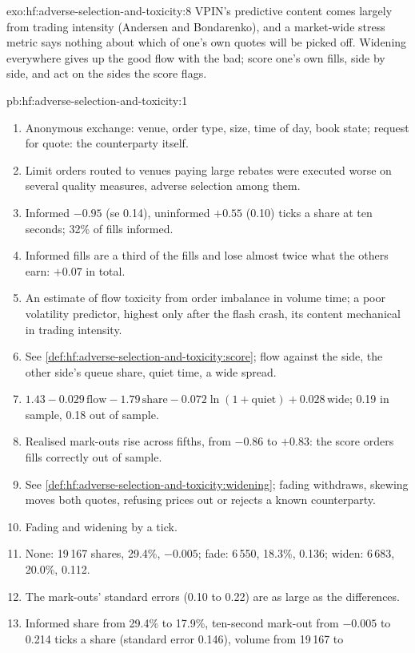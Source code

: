 \begin{solution}{exo:hf:adverse-selection-and-toxicity:8}
VPIN's predictive content comes largely from trading intensity (Andersen and Bondarenko), and a market-wide stress metric says nothing about which
of one's own quotes will be picked off. Widening everywhere gives up the good flow with the bad; score one's own fills, side by side, and act on the
sides the score flags.
\end{solution}

\begin{solution}{pb:hf:adverse-selection-and-toxicity:1}
\begin{enumerate}
\item Anonymous exchange: venue, order type, size, time of day, book state; request for quote: the counterparty itself.
\item Limit orders routed to venues paying large rebates were executed worse on several quality measures, adverse selection among them.
\item Informed $-0.95$ (se 0.14), uninformed $+0.55$ (0.10) ticks a share at ten seconds; 32\% of fills informed.
\item Informed fills are a third of the fills and lose almost twice what the others earn: $+0.07$ in total.
\item An estimate of flow toxicity from order imbalance in volume time; a poor volatility predictor, highest only after the flash crash, its content
mechanical in trading intensity.
\item See \cref{def:hf:adverse-selection-and-toxicity:score}; flow against the side, the other side's queue share, quiet time, a wide spread.
\item $1.43-0.029\,\text{flow}-1.79\,\text{share}-0.072\ln(1+\text{quiet})+0.028\,\text{wide}$; 0.19 in sample, 0.18 out of sample.
\item Realised mark-outs rise across fifths, from $-0.86$ to $+0.83$: the score orders fills correctly out of sample.
\item See \cref{def:hf:adverse-selection-and-toxicity:widening}; fading withdraws, skewing moves both quotes, refusing prices out or rejects a known
counterparty.
\item Fading and widening by a tick.
\item None: 19\,167 shares, 29.4\%, $-0.005$; fade: 6\,550, 18.3\%, 0.136; widen: 6\,683, 20.0\%, 0.112.
\item The mark-outs' standard errors (0.10 to 0.22) are as large as the differences.
\item Informed share from 29.4\% to 17.9\%, ten-second mark-out from $-0.005$ to 0.214 ticks a share (standard error 0.146), volume from 19\,167 to

\end{enumerate}
\end{solution}
